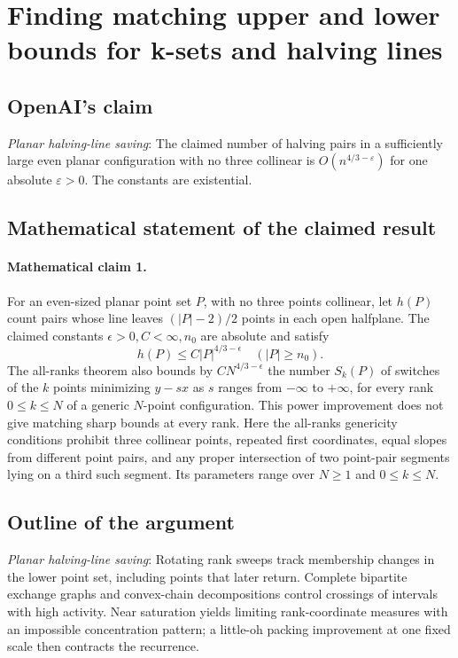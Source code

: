 \documentclass[11pt]{article}
\begin{document}
\section*{Finding matching upper and lower bounds for k-sets and halving lines}

\subsection{OpenAI's claim}
\textit{Planar halving-line saving}: The claimed number of halving pairs in a sufficiently large even planar configuration with no three collinear is $O(n^{4/3-\varepsilon})$ for one absolute $\varepsilon>0$. The constants are existential.

\subsection{Mathematical statement of the claimed result}
\paragraph{Mathematical claim 1.} For an even-sized planar point set $P$, with no three points collinear, let $h(P)$ count pairs whose line leaves $(|P|-2)/2$ points in each open halfplane. The claimed constants $\epsilon>0,C<\infty,n_0$ are absolute and satisfy \[h(P)\le C|P|^{4/3-\epsilon}\quad(|P|\ge n_0).\] The all-ranks theorem also bounds by $CN^{4/3-\epsilon}$ the number $S_k(P)$ of switches of the $k$ points minimizing $y-sx$ as $s$ ranges from $-\infty$ to $+\infty$, for every rank $0\le k\le N$ of a generic $N$-point configuration. This power improvement does not give matching sharp bounds at every rank. Here the all-ranks genericity conditions prohibit three collinear points, repeated first coordinates, equal slopes from different point pairs, and any proper intersection of two point-pair segments lying on a third such segment. Its parameters range over $N\ge1$ and $0\le k\le N$.

\subsection{Outline of the argument}
\textit{Planar halving-line saving}: Rotating rank sweeps track membership changes in the lower point set, including points that later return. Complete bipartite exchange graphs and convex-chain decompositions control crossings of intervals with high activity. Near saturation yields limiting rank-coordinate measures with an impossible concentration pattern; a little-oh packing improvement at one fixed scale then contracts the recurrence.
\end{document}
